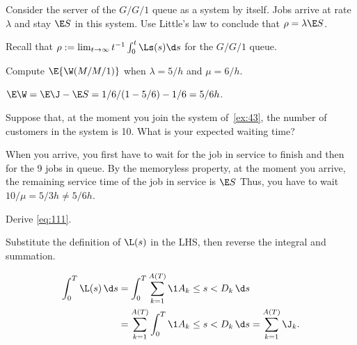 \begin{exercise}\label{ex:37}
 Consider the server of the $G/G/1$ queue as a system by itself.
Jobs arrive at rate $\lambda$ and stay $\E S$ in this system.
Use  Little's law to conclude that  $\rho = \lambda  \E S$.
\begin{solution}
Recall that  $\rho := \lim_{t\to\infty} t^{-1}\int_0^t \Ls(s)\d s$ for the $G/G/1$ queue.
\end{solution}
\end{exercise}


\begin{exercise}\label{ex:43}
Compute $\E{\W(M/M/1)}$  when $\lambda=5/h$ and $\mu=6/h$.
\begin{solution}
$\E\W = \E \J - \E S = 1/6/(1-5/6) - 1/6 = 5/6h$.
\end{solution}
\end{exercise}

\begin{exercise}\label{ex:44}
 Suppose that, at the moment you join the system of~\cref{ex:43}, the number of customers in the system is 10.
What is your  expected waiting time?
\begin{solution}
  When you arrive, you first have to wait for the job in service to finish and then for the 9 jobs in queue.
  By the memoryless property, at the moment you arrive, the remaining service time of the job in service is $\E S$ Thus, you have to wait $10/\mu = 5/3 h \neq 5/6 h$.
\end{solution}
\end{exercise}



\begin{exercise}\label{ex:59}
Derive \cref{eq:111}.
\begin{hint}
 Substitute the definition of $\L(s)$ in the LHS, then reverse the integral and summation.
\end{hint}
\begin{solution}
\begin{equation*}
 \begin{split}
 \int_0^T \L(s)\, \d s & = \int_0^T \sum_{k=1}^{A(T)} \1{A_k \leq s < D_k}\, \d s \\
& = \sum_{k=1}^{A(T)}\int_0^T \1{A_k \leq s < D_k}\, \d s = \sum_{k=1}^{A(T)} \J_k.
 \end{split}
\end{equation*}
\end{solution}
\end{exercise}



